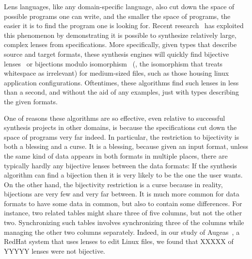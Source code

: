\documentclass[acmsmall,screen,anonymous]{acmart}
\begin{document}
Lens languages, like any domain-specific language, also cut down the space of
possible programs one can write, and the smaller the space of programs,
the easier it is to find the program one is looking for.  
Recent research~\cite{miltner+:bijective-synthesis,maina+:quotient-synthesis}
has exploited this phenomenon by demonstrating it is possible to synthesize relatively
large, complex lenses from specifications.
More specifically, given types that describe source and target formats, these synthesis
engines will quickly find bijective lenses~\cite{miltner+:bijective-synthesis} or
bijections modulo isomorphism~\cite{maina+quotient-synthesis} (\EG, the isomorphism that
treats whitespace as irrelevant) for medium-sized files, such as those housing linux
application configurations.  Oftentimes, these algorithms find such lenses in less than
a second, and without the aid of any examples, just with types describing the given
formats.

One of reasons these algorithms are so effective, even relative to successful synthesis projects
in other domains, is because the specifications cut down the space of programs very far
indeed.  In particular, the restriction to bijectivity is both a blessing and a curse.
It is a blessing, because given an input format, unless the same kind of data appears in
both formats in multiple places, there are typically hardly any bijective lenses between
the data formats:  If the synthesis algorithm can find a bijection then it is very likely
to be the one the user wants.  On the other hand, the bijectivity restriction is a curse
because in reality, bijections are very few and very far between.  It is much more common
for data formats to have some data in common, but also to contain some differences.  For
instance, two related tables might share three of five columns, but not the other two.
Synchronizing such tables involves synchronizing three of the columns while managing the
other two columns separately.  Indeed, in our study of Augeas~\cite{augeus}, a RedHat system that
uses lenses to edit Linux files, we found that XXXXX of YYYYY lenses were not bijective.
\end{document}
